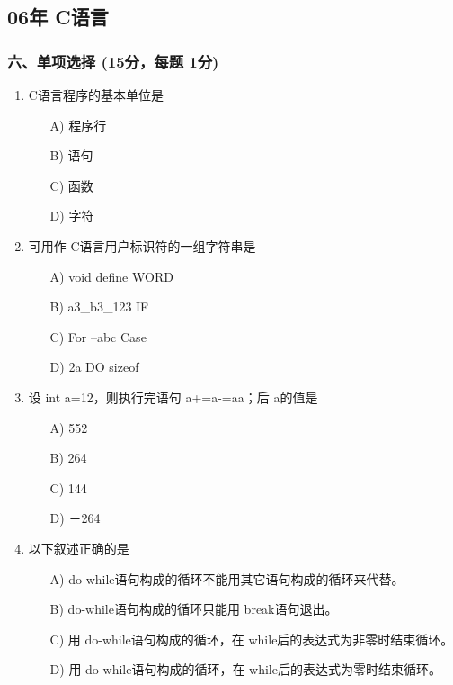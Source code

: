 \documentclass[12pt,a4paper]{article}
\begin{document}
\subsection*{06年 C语言}
\subsubsection*{六、单项选择 (15分，每题 1分)}
\begin{enumerate}
    \item C语言程序的基本单位是
    \begin{enumerate}
        \item[A)] 程序行
        \item[B)] 语句
        \item[C)] 函数
        \item[D)] 字符
    \end{enumerate}
    
    \item 可用作 C语言用户标识符的一组字符串是
    \begin{enumerate}
        \item[A)] void define WORD
        \item[B)] a3\_b3\_123 IF
        \item[C)] For –abc Case
        \item[D)] 2a DO sizeof
    \end{enumerate}
    
    \item 设 int a=12，则执行完语句 a+=a-=a\*a；后 a的值是
    \begin{enumerate}
        \item[A)] 552
        \item[B)] 264
        \item[C)] 144
        \item[D)] －264
    \end{enumerate}
    
    \item 以下叙述正确的是
    \begin{enumerate}
        \item[A)] do-while语句构成的循环不能用其它语句构成的循环来代替。
        \item[B)] do-while语句构成的循环只能用 break语句退出。
        \item[C)] 用 do-while语句构成的循环，在 while后的表达式为非零时结束循环。
        \item[D)] 用 do-while语句构成的循环，在 while后的表达式为零时结束循环。
    \end{enumerate}
    

\end{enumerate}
\end{document}
